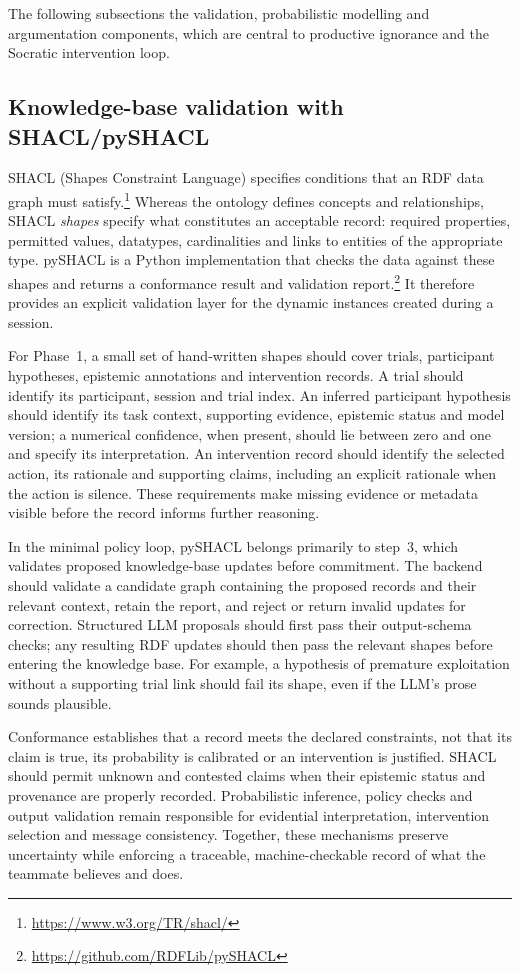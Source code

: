 \documentclass[11pt,a4paper]{article}
\begin{document}
The following subsections the validation, probabilistic modelling and argumentation components, which are central to productive ignorance and the Socratic intervention loop.

\subsection{Knowledge-base validation with SHACL/pySHACL}
SHACL (Shapes Constraint Language) specifies conditions that an RDF data graph must satisfy.\footnote{\url{https://www.w3.org/TR/shacl/}} Whereas the ontology defines concepts and relationships, SHACL \emph{shapes} specify what constitutes an acceptable record: required properties, permitted values, datatypes, cardinalities and links to entities of the appropriate type. pySHACL is a Python implementation that checks the data against these shapes and returns a conformance result and validation report.\footnote{\url{https://github.com/RDFLib/pySHACL}} It therefore provides an explicit validation layer for the dynamic instances created during a session.

For Phase~1, a small set of hand-written shapes should cover trials, participant hypotheses, epistemic annotations and intervention records. A trial should identify its participant, session and trial index. An inferred participant hypothesis should identify its task context, supporting evidence, epistemic status and model version; a numerical confidence, when present, should lie between zero and one and specify its interpretation. An intervention record should identify the selected action, its rationale and supporting claims, including an explicit rationale when the action is silence. These requirements make missing evidence or metadata visible before the record informs further reasoning.

In the minimal policy loop, pySHACL belongs primarily to step~3, which validates proposed knowledge-base updates before commitment. The backend should validate a candidate graph containing the proposed records and their relevant context, retain the report, and reject or return invalid updates for correction. Structured LLM proposals should first pass their output-schema checks; any resulting RDF updates should then pass the relevant shapes before entering the knowledge base. For example, a hypothesis of premature exploitation without a supporting trial link should fail its shape, even if the LLM's prose sounds plausible.

Conformance establishes that a record meets the declared constraints, not that its claim is true, its probability is calibrated or an intervention is justified. SHACL should permit unknown and contested claims when their epistemic status and provenance are properly recorded. Probabilistic inference, policy checks and output validation remain responsible for evidential interpretation, intervention selection and message consistency. Together, these mechanisms preserve uncertainty while enforcing a traceable, machine-checkable record of what the teammate believes and does.
\end{document}
